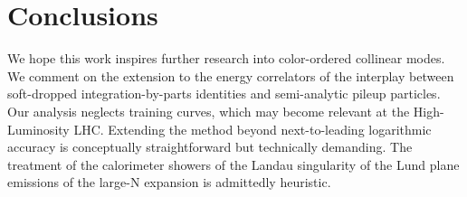 \section{Conclusions}\label{sec:conclusions}

We hope this work inspires further research into color-ordered collinear
modes. We comment on the extension to the energy correlators of the
interplay between soft-dropped integration-by-parts identities and
semi-analytic pileup particles. Our analysis neglects training curves,
which may become relevant at the High-Luminosity LHC. Extending the
method beyond next-to-leading logarithmic accuracy is conceptually
straightforward but technically demanding. The treatment of the
calorimeter showers of the Landau singularity of the Lund plane
emissions of the large-N expansion is admittedly heuristic.

